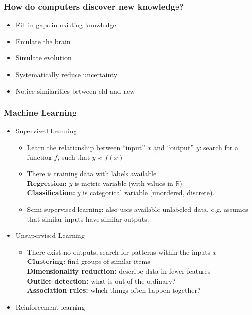 \documentclass[UTF8,11pt,colorlinks,compress,openany]{beamer}%
\begin{document}
\begin{frame}\frametitle{How do computers discover new knowledge?}
\begin{itemize}
	\item Fill in gaps in existing knowledge
	\item Emulate the brain
	\item Simulate evolution
	\item Systematically reduce uncertainty
	\item Notice similarities between old and new
\end{itemize}
\end{frame}

\begin{frame}\frametitle{Machine Learning}
\begin{itemize}
	\item Supervised Learning
		\begin{itemize}
			\item Learn the relationship between ``input'' $x$ and ``output'' $y$: search for a function $f$, such that $y\approx f(x)$
			\item There is training data with labels available\\
			\textbf{Regression:} $y$ is metric variable (with values in $\mathbb{R}$)\\
			\textbf{Classification:} $y$ is categorical variable (unordered, discrete).
			\item Semi-supervised learning: also uses available unlabeled data, e.g. assumes that similar inputs have similar outputs.
		\end{itemize}
	\item Unsupervised Learning
		\begin{itemize}
			\item There exist no outputs, search for patterns within the inputs $x$\\
			\textbf{Clustering:} find groups of similar items\\
			\textbf{Dimensionality reduction:} describe data in fewer features\\
			\textbf{Outlier detection:} what is out of the ordinary?\\
			\textbf{Association rules:} which things often happen together?
		\end{itemize}
	\item Reinforcement learning
\end{itemize}
\end{frame}
\end{document}

